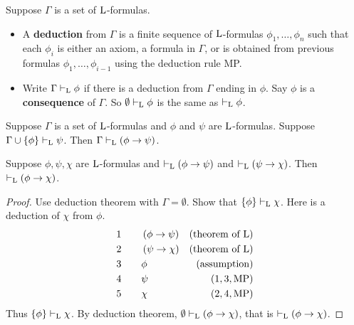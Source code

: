 
\begin{definition}
Suppose $ \Gamma $ is a set of $ \mathrm{L} $-formulas.
\begin{itemize}
\item A \textbf{deduction} from $ \Gamma $ is a finite sequence of $ \mathrm{L} $-formulas $ \phi_1, \dots, \phi_n $ such that each $ \phi_i $ is either an axiom, a formula in $ \Gamma $, or is obtained from previous formulas $ \phi_1, \dots, \phi_{i - 1} $ using the deduction rule MP.
\item Write $ \Gamma \vdash_{\mathrm{L}} \phi $ if there is a deduction from $ \Gamma $ ending in $ \phi $. Say $ \phi $ is a \textbf{consequence} of $ \Gamma $. So $ \emptyset \vdash_{\mathrm{L}} \phi $ is the same as $ \vdash_{\mathrm{L}} \phi $.
\end{itemize}
\end{definition}

\begin{theorem}
\label{thm:1.2.5}
Suppose $ \Gamma $ is a set of $ \mathrm{L} $-formulas and $ \phi $ and $ \psi $ are $ \mathrm{L} $-formulas. Suppose $ \Gamma \cup \cbr{\phi} \vdash_\L \psi $. Then $ \Gamma \vdash_\L \impb{\phi}{\psi} $.
\end{theorem}

\begin{corollary}
Suppose $ \phi, \psi, \chi $ are $ \mathrm{L} $-formulas and $ \vdash_\L \impb{\phi}{\psi} $ and $ \vdash_\L \impb{\psi}{\chi} $. Then $ \vdash_\L \impb{\phi}{\chi} $.
\end{corollary}

\begin{proof}
Use deduction theorem with $ \Gamma = \emptyset $. Show that $ \cbr{\phi} \vdash_\L \chi $. Here is a deduction of $ \chi $ from $ \phi $.
\begin{align*}
1 \qquad & \impb{\phi}{\psi} & \br{\text{theorem of} \ \L} \\
2 \qquad & \impb{\psi}{\chi} & \br{\text{theorem of} \ \L} \\
3 \qquad & \phi & \br{\text{assumption}} \\
4 \qquad & \psi & \br{1, 3, \text{MP}} \\
5 \qquad & \chi & \br{2, 4, \text{MP}}
\end{align*}
Thus $ \cbr{\phi} \vdash_\L \chi $. By deduction theorem, $ \emptyset \vdash_\L \impb{\phi}{\chi} $, that is $ \vdash_\L \impb{\phi}{\chi} $.
\end{proof}

